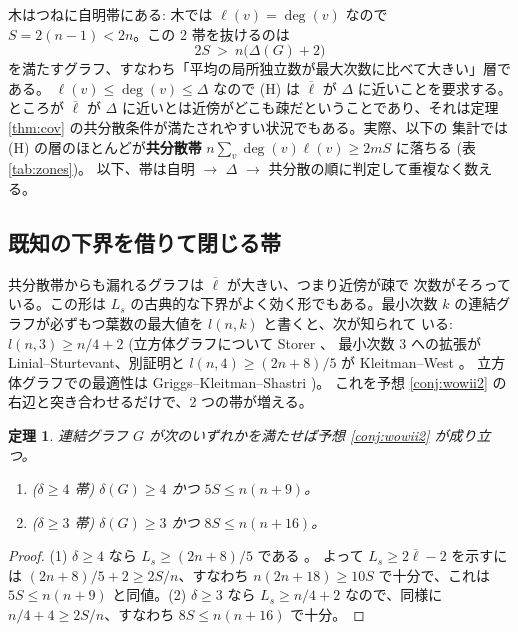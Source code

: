 \documentclass[paper=a4,fontsize=10.5pt,jafontsize=10.5pt]{jlreq}
\theoremstyle{plain}
\newtheorem{theorem}{定理}[section]
\theoremstyle{definition}
\begin{document}
木はつねに自明帯にある: 木では $\ell(v) = \deg(v)$ なので
$S = 2(n-1) < 2n$。この 2 帯を抜けるのは
\[ 2S \ > \ n\bigl(\Delta(G) + 2\bigr) \tag{H} \]
を満たすグラフ、すなわち「平均の局所独立数が最大次数に比べて大きい」層である。
$\ell(v) \le \deg(v) \le \Delta$ なので (H) は $\overline{\ell}$ が
$\Delta$ に近いことを要求する。ところが $\overline{\ell}$ が
$\Delta$ に近いとは近傍がどこも疎だということであり、それは定理
\ref{thm:cov} の共分散条件が満たされやすい状況でもある。実際、以下の
集計では (H) の層のほとんどが\textbf{共分散帯}
$n \sum_v \deg(v)\ell(v) \ge 2mS$ に落ちる (表 \ref{tab:zones})。
以下、帯は自明 $\to$ $\Delta$ $\to$ 共分散の順に判定して重複なく数える。

\subsection*{既知の下界を借りて閉じる帯}

共分散帯からも漏れるグラフは $\overline{\ell}$ が大きい、つまり近傍が疎で
次数がそろっている。この形は $L_s$ の古典的な下界がよく効く形でもある。最小次数
$k$ の連結グラフが必ずもつ葉数の最大値を $l(n,k)$ と書くと、次が知られて
いる: $l(n,3) \ge n/4 + 2$ (立方体グラフについて Storer \cite{storer}、
最小次数 3 への拡張が Linial--Sturtevant、別証明と
$l(n,4) \ge (2n+8)/5$ が Kleitman--West \cite{kw1991}。
立方体グラフでの最適性は Griggs--Kleitman--Shastri \cite{griggs})。
これを予想 \ref{conj:wowii2} の右辺と突き合わせるだけで、2 つの帯が増える。

\begin{theorem}\label{thm:mindeg}
連結グラフ $G$ が次のいずれかを満たせば予想 \ref{conj:wowii2} が成り立つ。
\begin{enumerate}
\item ($\delta \ge 4$ 帯) $\delta(G) \ge 4$ かつ $5S \le n(n+9)$。
\item ($\delta \ge 3$ 帯) $\delta(G) \ge 3$ かつ $8S \le n(n+16)$。
\end{enumerate}
\end{theorem}

\begin{proof}
(1) $\delta \ge 4$ なら $L_s \ge (2n+8)/5$ である \cite{kw1991}。
よって $L_s \ge 2\overline{\ell} - 2$ を示すには
$(2n+8)/5 + 2 \ge 2S/n$、すなわち $n(2n+18) \ge 10S$ で十分で、これは
$5S \le n(n+9)$ と同値。(2) $\delta \ge 3$ なら
$L_s \ge n/4 + 2$ \cite{storer,kw1991} なので、同様に
$n/4 + 4 \ge 2S/n$、すなわち $8S \le n(n+16)$ で十分。
\end{proof}
\end{document}
